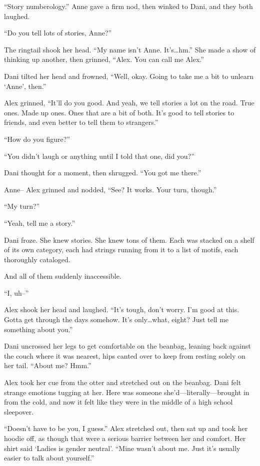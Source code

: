 ``Story numberology.'' Anne gave a firm nod, then winked to Dani, and they both laughed.

``Do you tell lots of stories, Anne?''

The ringtail shook her head. ``My name isn't Anne. It's\ldots{}hm.'' She made a show of thinking up another, then grinned, ``Alex. You can call me Alex.''

Dani tilted her head and frowned, ``Well, okay. Going to take me a bit to unlearn `Anne', then.''

Alex grinned, ``It'll do you good. And yeah, we tell stories a lot on the road. True ones. Made up ones. Ones that are a bit of both. It's good to tell stories to friends, and even better to tell them to strangers.''

``How do you figure?''

``You didn't laugh or anything until I told that one, did you?''

Dani thought for a moment, then shrugged. ``You got me there.''

Anne-- Alex grinned and nodded, ``See? It works. Your turn, though.''

``My turn?''

``Yeah, tell me a story.''

Dani froze. She knew stories. She knew tons of them. Each was stacked on a shelf of its own category, each had strings running from it to a list of motifs, each thoroughly cataloged.

And all of them suddenly inaccessible.

``I, uh--''

Alex shook her head and laughed. ``It's tough, don't worry. I'm good at this. Gotta get through the days somehow. It's only\ldots{}what, eight? Just tell me something about you.''

Dani uncrossed her legs to get comfortable on the beanbag, leaning back against the couch where it was nearest, hips canted over to keep from resting solely on her tail. ``About me? Hmm.''

Alex took her cue from the otter and stretched out on the beanbag. Dani felt strange emotions tugging at her. Here was someone she'd---literally---brought in from the cold, and now it felt like they were in the middle of a high school sleepover.

``Doesn't have to be you, I guess.'' Alex stretched out, then sat up and took her hoodie off, as though that were a serious barrier between her and comfort. Her shirt said `Ladies is gender neutral'. ``Mine wasn't about me. Just it's usually easier to talk about yourself.''

